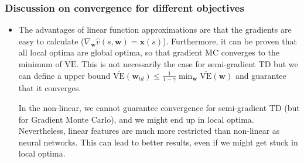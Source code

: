 \subsubsection{Discussion on convergence for different objectives}
\begin{itemize}
	\item The advantages of linear function approximations are that the gradients are easy to calculate ($\nabla_{\bm{w}}\hat{v}(s,\bm{w})=\bm{x}(s)$). Furthermore, it can be proven that all local optima are global optima, so that gradient MC converges to the minimum of $\overline{\text{VE}}$. This is not necessarily the case for semi-gradient TD but we can define a upper bound $\overline{\text{VE}}(\bm{w}_{td})\leq \frac{1}{1-\gamma}\min_{\bm{w}}\overline{\text{VE}}(\bm{w})$ and guarantee that it converges. 
	
	In the non-linear, we cannot guarantee convergence for semi-gradient TD (but for Gradient Monte Carlo), and we might end up in local optima. Nevertheless, linear features are much more restricted than non-linear as neural networks. This can lead to better results, even if we might get stuck in local optima.
	

\end{itemize}
